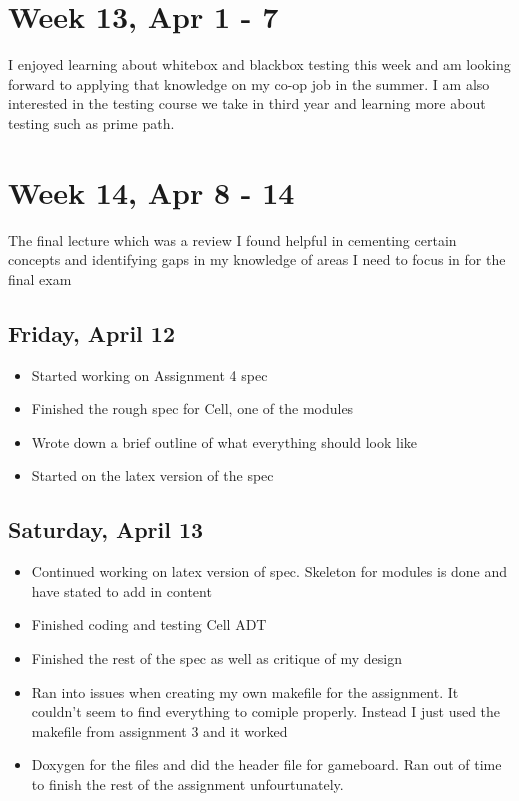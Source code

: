 \documentclass{article}
\begin{document}
\section{Week 13, Apr 1 - 7}

I enjoyed learning about whitebox and blackbox testing this week and am looking forward to applying that knowledge on my co-op job in the summer. I am also interested in the testing course we take in third year and learning more about testing such as prime path.

\section{Week 14, Apr 8 - 14}

The final lecture which was a review I found helpful in cementing certain concepts and identifying gaps in my knowledge of areas I need to focus in for the final exam

\subsection{Friday, April 12}
\begin{itemize}
    \item Started working on Assignment 4 spec
    \item Finished the rough spec for Cell, one of the modules
    \item Wrote down a brief outline of what everything should look like
    \item Started on the latex version of the spec
\end{itemize}

\subsection{Saturday, April 13}
\begin{itemize}
    \item Continued working on latex version of spec. Skeleton for modules is done and have stated to add in content
    \item Finished coding and testing Cell ADT
    \item Finished the rest of the spec as well as critique of my design
    \item Ran into issues when creating my own makefile for the assignment. It couldn't seem to find everything to comiple properly. Instead I just used the makefile from assignment 3 and it worked
    \item Doxygen for the files and did the header file for gameboard. Ran out of time to finish the rest of the assignment unfourtunately.
\end{itemize}
\end{document}
